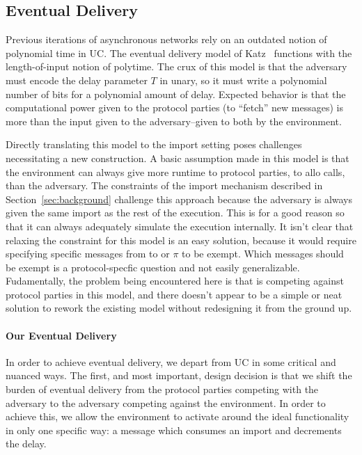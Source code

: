 

\subsection{Eventual Delivery}
Previous iterations of asynchronous networks rely on an outdated notion of polynomial time in UC.
The eventual delivery model of Katz~\cite{katzuc} functions with the length-of-input notion of polytime.
The crux of this model is that the adversary must encode the delay parameter $T$ in unary, so it must write a polynomial number of bits for a polynomial amount of delay.
Expected behavior is that the computational power given to the protocol parties (to ``fetch'' new messages) is more than the input given to the adversary--given to both by the environment.

Directly translating this model to the import setting poses challenges necessitating a new construction.
A basic assumption made in this model is that the environment can always give more runtime to protocol parties, to allo  calls, than the adversary.
The constraints of the import mechanism described in Section~\ref{sec:background} challenge this approach because the adversary is always given the same import as the rest of the execution.
This is for a good reason so that it can always adequately simulate the execution internally.
It isn't clear that relaxing the constraint for this model is an easy solution, because it would require specifying specific messages from \Z to \A or $\pi$ to be exempt.
Which messages should be exempt is a protocol-specfic question and not easily generalizable.
Fudamentally, the problem being encountered here is that \A is competing against protocol parties in this model, and there doesn't appear to be a simple or neat solution to rework the existing model without redesigning it from the ground up.

\paragraph{Our Eventual Delivery}
In order to achieve eventual delivery, we depart from UC in some critical and nuanced ways.
The first, and most important, design decision is that we shift the burden of eventual delivery from the protocol parties competing with the adversary to the adversary competing against the environment. 
In order to achieve this, we allow the environment to activate \fwrapper around the ideal functionality in only one specific way: a  message which consumes an import and decrements the delay.

